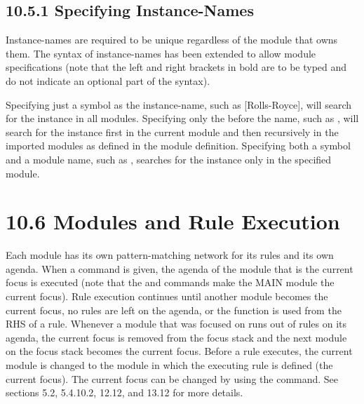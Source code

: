 \documentclass[letterpaper,10pt,english]{sphinxmanual}
\begin{document}
\subsection{10.5.1 Specifying Instance-Names}
\label{\detokenize{defmodule:specifying-instance-names}}
Instance-names are required to be unique regardless of the module that
owns them. The syntax of instance-names has been extended to allow
module specifications (note that the left and right brackets in bold are
to be typed and do not indicate an optional part of the syntax).


\begin{sphinxVerbatim}[commandchars=\\\{\}]
  \PYG{p}{[} \PYG{p}{]}  \PYG{p}{[}\PYG{p}{]}  \PYG{p}{[} \PYG{p}{]}
\end{sphinxVerbatim}

Specifying just a symbol as the instance-name, such as {[}Rolls-Royce{]},
will search for the instance in all modules. Specifying only the \sphinxcode{\sphinxupquote{::}}
before the name, such as , will search for the instance
first in the current module and then recursively in the imported modules
as defined in the module definition. Specifying both a symbol and a
module name, such as , searches for the instance only
in the specified module.


\section{10.6 Modules and Rule Execution}
\label{\detokenize{defmodule:modules-and-rule-execution}}
Each module has its own pattern-matching network for its rules and its
own agenda. When a  command is given, the agenda of the module
that is the current focus is executed (note that the  and
 commands make the MAIN module the current focus). Rule
execution continues until another module becomes the current focus, no
rules are left on the agenda, or the  function is used from
the RHS of a rule. Whenever a module that was focused on runs out of
rules on its agenda, the current focus is removed from the focus stack
and the next module on the focus stack becomes the current focus. Before
a rule executes, the current module is changed to the module in which
the executing rule is defined (the current focus). The current focus can
be changed by using the  command. See sections 5.2, 5.4.10.2,
12.12, and 13.12 for more details.
\end{document}
